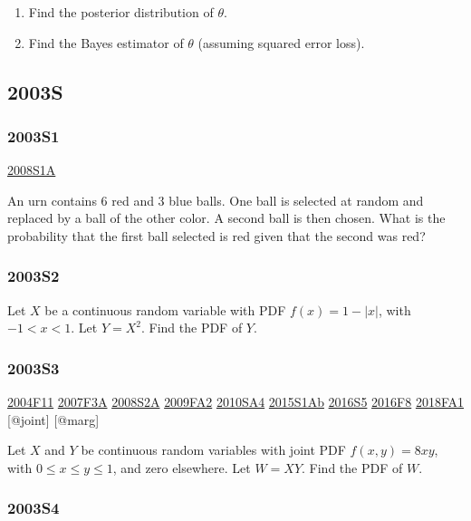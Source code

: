 \documentclass[6pt,twocolumn,Portrait]{article}
\begin{document}
\begin{enumerate}
\def\labelenumi{\Alph{enumi})}
\item
  Find the posterior distribution of \(\theta\).
\item
  Find the Bayes estimator of \(\theta\) (assuming squared error loss).
\end{enumerate}

\hypertarget{s}{%
\subsection{2003S}\label{s}}

\hypertarget{s1}{%
\subsubsection{2003S1}\label{s1}}

\protect\hyperlink{s1a}{2008S1A}

An urn contains 6 red and 3 blue balls. One ball is selected at random
and replaced by a ball of the other color. A second ball is then chosen.
What is the probability that the first ball selected is red given that
the second was red?

\hypertarget{s2}{%
\subsubsection{2003S2}\label{s2}}

Let \(X\) be a continuous random variable with PDF \(f(x)=1-|x|\), with
\(-1<x<1\). Let \(Y=X^2\). Find the PDF of \(Y\).

\hypertarget{s3}{%
\subsubsection{2003S3}\label{s3}}

\protect\hyperlink{f11}{2004F11} \protect\hyperlink{f3a}{2007F3A}
\protect\hyperlink{s2a}{2008S2A} \protect\hyperlink{fa2}{2009FA2}
\protect\hyperlink{sa4-1}{2010SA4} \protect\hyperlink{s1ab}{2015S1Ab}
\protect\hyperlink{s5-4}{2016S5} \protect\hyperlink{f8-4}{2016F8}
\protect\hyperlink{fa1-4}{2018FA1} {[}@joint{]} {[}@marg{]}

Let \(X\) and \(Y\) be continuous random variables with joint PDF
\(f(x,y)=8xy\), with \(0\le x\le y\le1\), and zero elsewhere. Let
\(W=XY\). Find the PDF of \(W\).

\hypertarget{s4}{%
\subsubsection{2003S4}\label{s4}}
\end{document}
